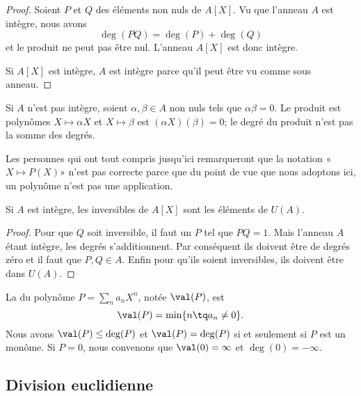\begin{proof}
    Soient \( P\) et \( Q\) des éléments non nuls de \( A[X]\). Vu que l'anneau \( A\) est intègre, nous avons
    \begin{equation}
        \deg(PQ)=\deg(P)+\deg(Q)
    \end{equation}
    et le produit ne peut pas être nul. L'anneau \( A[X]\) est donc intègre.

    Si \( A[X]\) est intègre, \( A\) est intègre parce qu'il peut être vu comme sous anneau.
\end{proof}

\begin{normaltext}
    Si \( A\) n'est pas intègre, soient \( \alpha,\beta\in A\) non nuls tels que \( \alpha\beta=0\). Le produit est polynômes \( X\mapsto \alpha X\) et \( X\mapsto \beta\) est \( (\alpha X)(\beta)=0\); le degré du produit n'est pas la somme des degrés.

    Les personnes qui ont tout compris jusqu'ici remarqueront que la notation «\( X\mapsto P(X)\)» n'est pas correcte parce que du point de vue que nous adoptons ici, un polynôme n'est pas une application.
\end{normaltext}

\begin{corollary}
    Si \( A\) est intègre, les inversibles de \( A[X]\) sont les éléments de \( U(A)\).
\end{corollary}

\begin{proof}
    Pour que \( Q\) soit inversible, il faut un \( P\) tel que \( PQ=1\). Mais l'anneau \( A\) étant intègre, les degrés s'additionnent. Par conséquent ils doivent être de degrés zéro et il faut que \( P,Q\in A\). Enfin pour qu'ils soient inversibles, ils doivent être dans \( U(A)\).
\end{proof}

La  du polynôme \( P=\sum_n a_nX^n\), notée \( \val(P)\), est 
\begin{equation}
    \val(P)=\min\{ n\tq a_n\neq 0 \}.
\end{equation}
Nous avons \( \val(P)\leq \deg(P)\) et \( \val(P)=\deg(P)\) si et seulement si \( P\) est un monôme. Si \( P=0\), nous convenons que \( \val(0)=\infty\) et \( \deg(0)=-\infty\).

\subsection{Division euclidienne}

